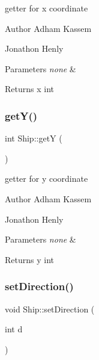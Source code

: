 getter for x coordinate \begin{DoxyAuthor}{Author}
Adham Kassem 

Jonathon Henly 
\end{DoxyAuthor}

\begin{DoxyParams}{Parameters}
{\em none} & \\
\hline
\end{DoxyParams}
\begin{DoxyReturn}{Returns}
x int 
\end{DoxyReturn}
\mbox{\label{classShip_a0cde4e9b74fb71cbf61f79e0a1b74059}} 
\subsubsection{\texorpdfstring{get\+Y()}{getY()}}
{\footnotesize\ttfamily int Ship\+::getY (\begin{DoxyParamCaption}{ }\end{DoxyParamCaption})\hspace{0.3cm}{\ttfamily [inline]}}

getter for y coordinate \begin{DoxyAuthor}{Author}
Adham Kassem 

Jonathon Henly 
\end{DoxyAuthor}

\begin{DoxyParams}{Parameters}
{\em none} & \\
\hline
\end{DoxyParams}
\begin{DoxyReturn}{Returns}
y int 
\end{DoxyReturn}
\mbox{\label{classShip_aa37f8f11f87ee3e17285816c5c6dc6f8}} 
\subsubsection{\texorpdfstring{set\+Direction()}{setDirection()}}
{\footnotesize\ttfamily void Ship\+::set\+Direction (\begin{DoxyParamCaption}\item[{int}]{d }\end{DoxyParamCaption})\hspace{0.3cm}{\ttfamily [inline]}}

